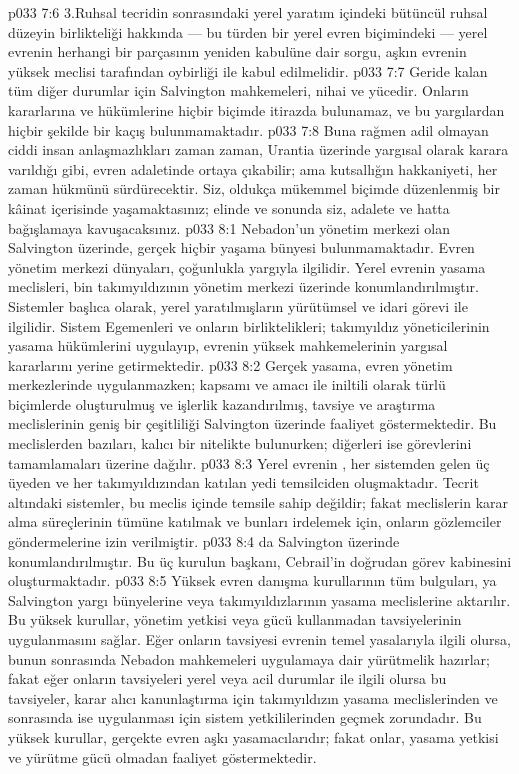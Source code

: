 \vs p033 7:6 3.\bibnobreakspace Ruhsal tecridin sonrasındaki yerel yaratım içindeki bütüncül ruhsal düzeyin birlikteliği hakkında --- bu türden bir yerel evren biçimindeki --- yerel evrenin herhangi bir parçasının yeniden kabulüne dair sorgu, aşkın evrenin yüksek meclisi tarafından oybirliği ile kabul edilmelidir.
\vs p033 7:7 Geride kalan tüm diğer durumlar için Salvington mahkemeleri, nihai ve yücedir. Onların kararlarına ve hükümlerine hiçbir biçimde itirazda bulunamaz, ve bu yargılardan hiçbir şekilde bir kaçış bulunmamaktadır.
\vs p033 7:8 Buna rağmen adil olmayan ciddi insan anlaşmazlıkları zaman zaman, Urantia üzerinde yargısal olarak karara varıldığı gibi, evren adaletinde ortaya çıkabilir; ama kutsallığın hakkaniyeti, her zaman hükmünü sürdürecektir. Siz, oldukça mükemmel biçimde düzenlenmiş bir kâinat içerisinde yaşamaktasınız; elinde ve sonunda siz, adalete ve hatta bağışlamaya kavuşacaksınız.
\vs p033 8:1 Nebadon’un yönetim merkezi olan Salvington üzerinde, gerçek hiçbir yaşama bünyesi bulunmamaktadır. Evren yönetim merkezi dünyaları, çoğunlukla yargıyla ilgilidir. Yerel evrenin yasama meclisleri, bin takımyıldızının yönetim merkezi üzerinde konumlandırılmıştır. Sistemler başlıca olarak, yerel yaratılmışların yürütümsel ve idari görevi ile ilgilidir. Sistem Egemenleri ve onların birliktelikleri; takımyıldız yöneticilerinin yasama hükümlerini uygulayıp, evrenin yüksek mahkemelerinin yargısal kararlarını yerine getirmektedir.
\vs p033 8:2 Gerçek yasama, evren yönetim merkezlerinde uygulanmazken; kapsamı ve amacı ile iniltili olarak türlü biçimlerde oluşturulmuş ve işlerlik kazandırılmış, tavsiye ve araştırma meclislerinin geniş bir çeşitliliği Salvington üzerinde faaliyet göstermektedir. Bu meclislerden bazıları, kalıcı bir nitelikte bulunurken; diğerleri ise görevlerini tamamlamaları üzerine dağılır.
\vs p033 8:3 Yerel evrenin , her sistemden gelen üç üyeden ve her takımyıldızından katılan yedi temsilciden oluşmaktadır. Tecrit altındaki sistemler, bu meclis içinde temsile sahip değildir; fakat meclislerin karar alma süreçlerinin tümüne katılmak ve bunları irdelemek için, onların gözlemciler göndermelerine izin verilmiştir.
\vs p033 8:4  da Salvington üzerinde konumlandırılmıştır. Bu üç kurulun başkanı, Cebrail’in doğrudan görev kabinesini oluşturmaktadır.
\vs p033 8:5 Yüksek evren danışma kurullarının tüm bulguları, ya Salvington yargı bünyelerine veya takımyıldızlarının yasama meclislerine aktarılır. Bu yüksek kurullar, yönetim yetkisi veya gücü kullanmadan tavsiyelerinin uygulanmasını sağlar. Eğer onların tavsiyesi evrenin temel yasalarıyla ilgili olursa, bunun sonrasında Nebadon mahkemeleri uygulamaya dair yürütmelik hazırlar; fakat eğer onların tavsiyeleri yerel veya acil durumlar ile ilgili olursa bu tavsiyeler, karar alıcı kanunlaştırma için takımyıldızın yasama meclislerinden ve sonrasında ise uygulanması için sistem yetkililerinden geçmek zorundadır. Bu yüksek kurullar, gerçekte evren aşkı yasamacılarıdır; fakat onlar, yasama yetkisi ve yürütme gücü olmadan faaliyet göstermektedir.
